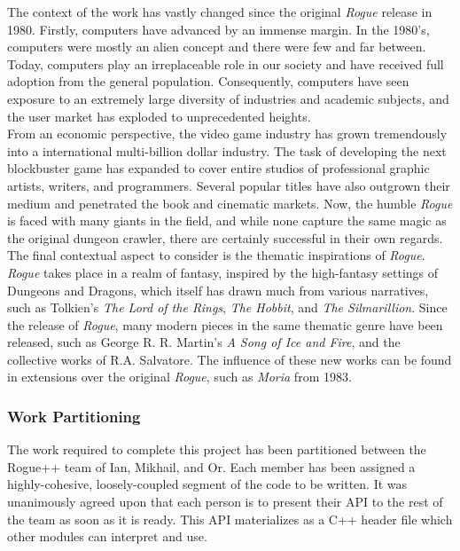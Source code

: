 \documentclass[12pt, titlepage]{article}
\begin{document}
		The context of the work has vastly changed since the original \textit{Rogue} release in 1980.  Firstly, computers have advanced by an immense margin.  In the 1980's, computers were mostly an alien concept and there were few and far between.  Today, computers play an irreplaceable role in our society and have received full adoption from the general population.  Consequently, computers have seen exposure to an extremely large diversity of industries and academic subjects, and the user market has exploded to unprecedented heights.\\

		From an economic perspective, the video game industry has grown tremendously into a international multi-billion dollar industry.  The task of developing the next blockbuster game has expanded to cover entire studios of professional graphic artists, writers, and programmers.  Several popular titles have also outgrown their medium and penetrated the book and cinematic markets.  Now, the humble \textit{Rogue} is faced with many giants in the field, and while none capture the same magic as the original dungeon crawler, there are certainly successful in their own regards.\\

		The final contextual aspect to consider is the thematic inspirations of \textit{Rogue}. \textit{Rogue} takes place in a realm of fantasy, inspired by the high-fantasy settings of Dungeons and Dragons, which itself has drawn much from various narratives, such as Tolkien's \textit{The Lord of the Rings}, \textit{The Hobbit}, and \textit{The Silmarillion}.  Since the release of \textit{Rogue}, many modern pieces in the same thematic genre have been released, such as George R. R. Martin's \textit{A Song of Ice and Fire}, and the collective works of R.A. Salvatore.  The influence of these new works can be found in extensions over the original \textit{Rogue}, such as \textit{Moria} from 1983.

		\subsubsection{Work Partitioning}

		The work required to complete this project has been partitioned between the Rogue++ team of Ian, Mikhail, and Or.  Each member has been assigned a highly-cohesive, loosely-coupled segment of the code to be written.  It was unanimously agreed upon that each person is to present their API to the rest of the team as soon as it is ready. This API materializes as a C++ header file which other modules can interpret and use.\\
\end{document}
